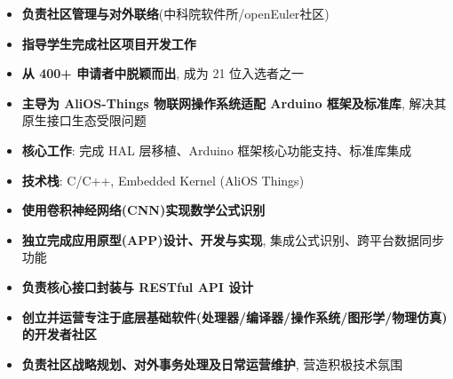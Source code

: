 \documentclass{resume}
\begin{document}
\begin{itemize}
  \item \textbf{负责社区管理与对外联络}(中科院软件所/openEuler社区)
  \item \textbf{指导学生完成社区项目开发工作}
\end{itemize}

\continue
\clearpage

\begin{itemize}
  \item \textbf{从 400+ 申请者中脱颖而出}, 成为 21 位入选者之一
  \item \textbf{主导为 AliOS-Things 物联网操作系统适配 Arduino 框架及标准库}, 解决其原生接口生态受限问题
  \item \textbf{核心工作}: 完成 HAL 层移植、Arduino 框架核心功能支持、标准库集成
  \item \textbf{技术栈}: C/C++, Embedded Kernel (AliOS Things)
\end{itemize}

\begin{itemize}
  \item \textbf{使用卷积神经网络(CNN)实现数学公式识别}
  \item \textbf{独立完成应用原型(APP)设计、开发与实现}, 集成公式识别、跨平台数据同步功能
  \item \textbf{负责核心接口封装与 RESTful API 设计}
\end{itemize}

\begin{itemize}
  \item \textbf{创立并运营专注于底层基础软件(处理器/编译器/操作系统/图形学/物理仿真)的开发者社区}
  \item \textbf{负责社区战略规划、对外事务处理及日常运营维护}, 营造积极技术氛围
\end{itemize}
\end{document}
